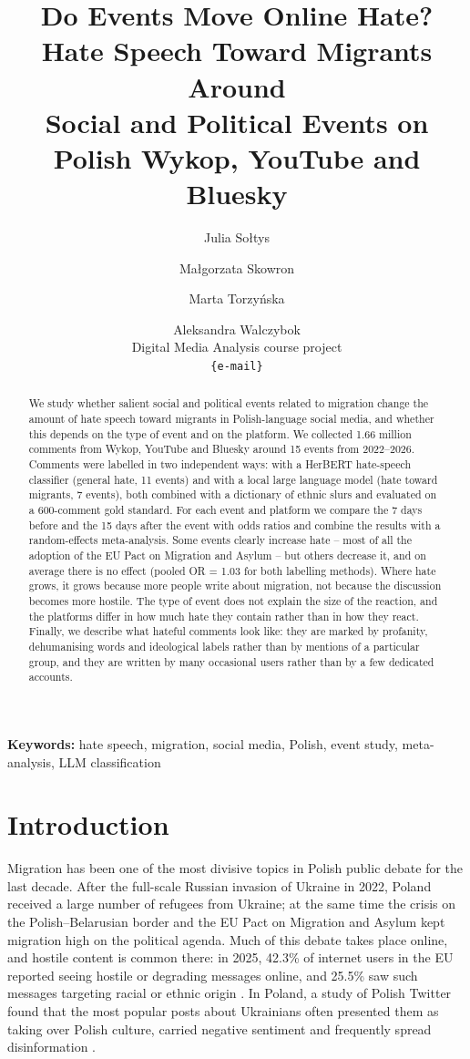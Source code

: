 \documentclass[11pt]{article}
\title{Do Events Move Online Hate? Hate Speech Toward Migrants Around\\
Social and Political Events on Polish Wykop, YouTube and Bluesky}
\author{Julia Sołtys \and Małgorzata Skowron \and Marta Torzyńska \and Aleksandra Walczybok \\
  Digital Media Analysis course project \\
  \texttt{\{e-mail\}}}
\begin{document}
\maketitle

\begin{abstract}
We study whether salient social and political events related to migration change the amount of hate speech toward migrants in Polish-language social media, and whether this depends on the type of event and on the platform. We collected 1.66 million comments from Wykop, YouTube and Bluesky around 15 events from 2022--2026. Comments were labelled in two independent ways: with a HerBERT hate-speech classifier (general hate, 11 events) and with a local large language model (hate toward migrants, 7 events), both combined with a dictionary of ethnic slurs and evaluated on a 600-comment gold standard. For each event and platform we compare the 7 days before and the 15 days after the event with odds ratios and combine the results with a random-effects meta-analysis. Some events clearly increase hate -- most of all the adoption of the EU Pact on Migration and Asylum -- but others decrease it, and on average there is no effect (pooled OR = 1.03 for both labelling methods). Where hate grows, it grows because more people write about migration, not because the discussion becomes more hostile. The type of event does not explain the size of the reaction, and the platforms differ in how much hate they contain rather than in how they react. Finally, we describe what hateful comments look like: they are marked by profanity, dehumanising words and ideological labels rather than by mentions of a particular group, and they are written by many occasional users rather than by a few dedicated accounts.
\end{abstract}

\noindent\textbf{Keywords:} hate speech, migration, social media, Polish, event study, meta-analysis, LLM classification

\section{Introduction}

Migration has been one of the most divisive topics in Polish public debate for the last decade. After the full-scale Russian invasion of Ukraine in 2022, Poland received a large number of refugees from Ukraine; at the same time the crisis on the Polish--Belarusian border and the EU Pact on Migration and Asylum kept migration high on the political agenda. Much of this debate takes place online, and hostile content is common there: in 2025, 42.3\% of internet users in the EU reported seeing hostile or degrading messages online, and 25.5\% saw such messages targeting racial or ethnic origin \citep{eurostat2026}. In Poland, a study of Polish Twitter found that the most popular posts about Ukrainians often presented them as taking over Polish culture, carried negative sentiment and frequently spread disinformation \citep{lipinska2025}.
\end{document}
